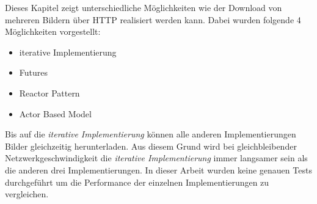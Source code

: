 Dieses Kapitel zeigt unterschiedliche Möglichkeiten wie der Download von mehreren Bildern über HTTP realisiert werden kann. Dabei wurden folgende 4 Möglichkeiten vorgestellt: 

\begin{itemize}
  \item iterative Implementierung
  \item Futures
  \item Reactor Pattern
  \item Actor Based Model
\end{itemize}

Bis auf die \emph{iterative Implementierung} können alle anderen Implementierungen Bilder gleichzeitig herunterladen. Aus diesem Grund wird bei gleichbleibender Netzwerkgeschwindigkeit die \emph{iterative Implementierung} immer langsamer sein als die anderen drei Implementierungen. In dieser Arbeit wurden keine genauen Tests durchgeführt um die Performance der einzelnen Implementierungen zu vergleichen.